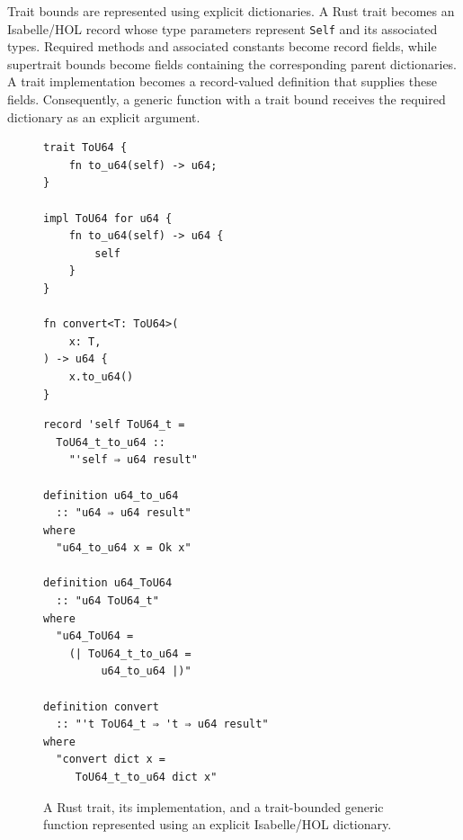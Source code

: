 

%   

Trait bounds are represented using explicit dictionaries.  A Rust trait
becomes an Isabelle/HOL record whose type parameters represent \texttt{Self} and its associated types.  Required methods and associated constants become record fields, while supertrait bounds become fields containing the corresponding parent dictionaries.  A trait implementation becomes a record-valued definition that supplies these fields.  Consequently, a generic function with a trait bound receives the required dictionary as an explicit argument.

\begin{figure}[!ht]
\centering
\begin{minipage}[t]{0.38\textwidth}
\begin{verbatim}
trait ToU64 {
    fn to_u64(self) -> u64;
}

impl ToU64 for u64 {
    fn to_u64(self) -> u64 {
        self
    }
}

fn convert<T: ToU64>(
    x: T,
) -> u64 {
    x.to_u64()
}
\end{verbatim}
\end{minipage}
\hfill
\vrule{}
\hfill
\begin{minipage}[t]{0.54\textwidth}
\begin{verbatim}
record 'self ToU64_t =
  ToU64_t_to_u64 ::
    "'self ⇒ u64 result"

definition u64_to_u64
  :: "u64 ⇒ u64 result"
where
  "u64_to_u64 x = Ok x"

definition u64_ToU64
  :: "u64 ToU64_t"
where
  "u64_ToU64 =
    (| ToU64_t_to_u64 =
         u64_to_u64 |)"

definition convert
  :: "'t ToU64_t ⇒ 't ⇒ u64 result"
where
  "convert dict x =
     ToU64_t_to_u64 dict x"
\end{verbatim}
\end{minipage}
\caption{A Rust trait, its implementation, and a trait-bounded generic function represented using an explicit Isabelle/HOL dictionary.}
\label{fig:trait-dictionary}
\end{figure}

